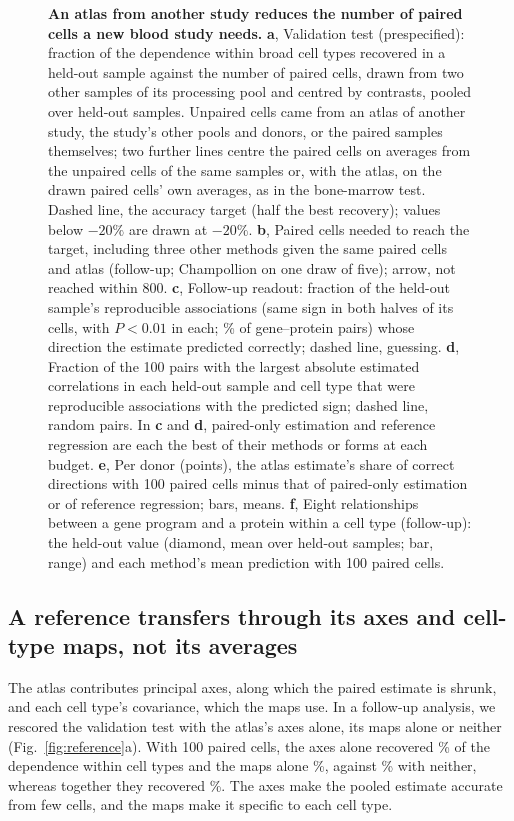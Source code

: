 \documentclass[pdflatex,sn-vancouver-num,iicol]{sn-jnl}
\begin{document}
\begin{figure}[tp]
\centering

\caption{\textbf{An atlas from another study reduces the number of paired cells a new blood study needs.}
\textbf{a}, Validation test (prespecified): fraction of the dependence within broad cell types recovered in a held-out sample against the number of paired cells, drawn from two other samples of its processing pool and centred by contrasts, pooled over \VlNFolds{} held-out samples. Unpaired cells came from an atlas of another study, the study's other pools and donors, or the paired samples themselves; two further lines centre the paired cells on averages from the unpaired cells of the same samples or, with the atlas, on the drawn paired cells' own averages, as in the bone-marrow test. Dashed line, the accuracy target (half the best recovery); values below $-20\%$ are drawn at $-20\%$.
\textbf{b}, Paired cells needed to reach the target, including three other methods given the same paired cells and atlas (follow-up; Champollion on one draw of five); arrow, not reached within 800.
\textbf{c}, Follow-up readout: fraction of the held-out sample's reproducible associations (same sign in both halves of its cells, with $P<0.01$ in each; \BoRepShare\% of gene--protein pairs) whose direction the estimate predicted correctly; dashed line, guessing.
\textbf{d}, Fraction of the 100 pairs with the largest absolute estimated correlations in each held-out sample and cell type that were reproducible associations with the predicted sign; dashed line, random pairs. In \textbf{c} and \textbf{d}, paired-only estimation and reference regression are each the best of their methods or forms at each budget.
\textbf{e}, Per donor (points), the atlas estimate's share of correct directions with 100 paired cells minus that of paired-only estimation or of reference regression; bars, means.
\textbf{f}, Eight relationships between a gene program and a protein within a cell type (follow-up): the held-out value (diamond, mean over held-out samples; bar, range) and each method's mean prediction with 100 paired cells.}
\label{fig:atlas}
\end{figure}

\subsection{A reference transfers through its axes and cell-type maps, not its averages}
The atlas contributes principal axes, along which the paired estimate is shrunk, and each cell type's covariance, which the maps use. In a follow-up analysis, we rescored the validation test with the atlas's axes alone, its maps alone or neither (Fig.~\ref{fig:reference}a). With 100 paired cells, the axes alone recovered \RvAxesHundred\% of the dependence within cell types and the maps alone \RvMapOnlyHundred\%, against \RvNeitherHundred\% with neither, whereas together they recovered \RvBothHundred\%. The axes make the pooled estimate accurate from few cells, and the maps make it specific to each cell type.
\end{document}
